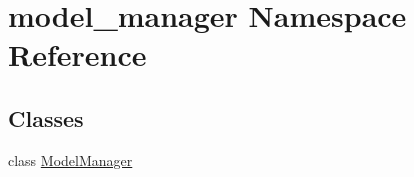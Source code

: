 \hypertarget{namespacemodel__manager}{}\section{model\+\_\+manager Namespace Reference}
\label{namespacemodel__manager}
\subsection*{Classes}
\begin{DoxyCompactItemize}
\item 
class \hyperlink{classmodel__manager_1_1_model_manager}{Model\+Manager}
\end{DoxyCompactItemize}
